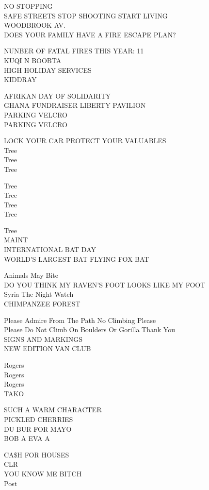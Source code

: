 \documentclass[10pt,letterpaper]{article}
\begin{document}
NO STOPPING\\
SAFE STREETS STOP SHOOTING START LIVING\\
WOODBROOK AV.\\
DOES YOUR FAMILY HAVE A FIRE ESCAPE PLAN?

NUNBER OF FATAL FIRES THIS YEAR: 11\\
KUQI N BOOBTA\\
HIGH HOLIDAY SERVICES\\
KIDDRAY

AFRIKAN DAY OF SOLIDARITY\\
GHANA FUNDRAISER LIBERTY PAVILION\\
PARKING VELCRO\\
PARKING VELCRO

LOCK YOUR CAR PROTECT YOUR VALUABLES\\
Tree\\
Tree\\
Tree

Tree\\
Tree\\
Tree\\
Tree

Tree\\
MAINT\\
INTERNATIONAL BAT DAY\\
WORLD'S LARGEST BAT FLYING FOX BAT

Animals May Bite\\
DO YOU THINK MY RAVEN'S FOOT LOOKS LIKE MY FOOT\\
Syria The Night Watch\\
CHIMPANZEE FOREST

Please Admire From The Path No Climbing Please\\
Please Do Not Climb On Boulders Or Gorilla Thank You\\
SIGNS AND MARKINGS\\
NEW EDITION VAN CLUB

Rogers\\
Rogers\\
Rogers\\
TAKO

SUCH A WARM CHARACTER\\
PICKLED CHERRIES\\
DU BUR FOR MAYO\\
BOB A EVA A

CA\$H FOR HOUSES\\
CLR\\
YOU KNOW ME BITCH\\
Post
\end{document}
